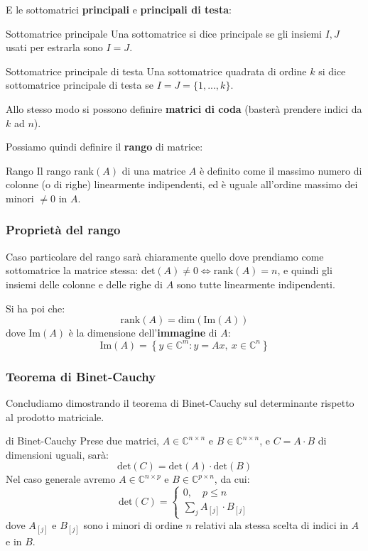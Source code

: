 \documentclass[a4paper,11pt]{article}
\begin{document}
E le sottomatrici \textbf{principali} e \textbf{principali di testa}:
\begin{definition}{Sottomatrice principale}
	Una sottomatrice si dice principale se gli insiemi $I, J$ usati per estrarla sono $I = J$.
\end{definition}
\begin{definition}{Sottomatrice principale di testa}
	Una sottomatrice quadrata di ordine $k$ si dice sottomatrice principale di testa se $I = J = \{ 1, ..., k \}$.
\end{definition}
Allo stesso modo si possono definire \textbf{matrici di coda} (basterà prendere indici da $k$ ad $n$).

Possiamo quindi definire il \textbf{rango} di matrice:
\begin{definition}{Rango}
	Il rango $\mathrm{rank}(A)$ di una matrice $A$ è definito come il massimo numero di colonne (o di righe) linearmente indipendenti, ed è uguale all'ordine massimo dei minori $\neq 0$ in $A$.
\end{definition}

\subsubsection{Proprietà del rango}
Caso particolare del rango sarà chiaramente quello dove prendiamo come sottomatrice la matrice stessa: $\mathrm{det}(A) \neq 0 \Leftrightarrow \mathrm{rank}(A) = n$, e quindi gli insiemi delle colonne e delle righe di $A$ sono tutte linearmente indipendenti.

Si ha poi che:
$$
\mathrm{rank}(A) = \mathrm{dim}(\mathrm{Im}(A))
$$
dove $\mathrm{Im}(A)$ è la dimensione dell'\textbf{immagine} di $A$:
$$
\mathrm{Im}(A) = \left\{ y \in \mathbb{C}^m : y = Ax, \ x \in \mathbb{C}^n \right\}
$$

\subsubsection{Teorema di Binet-Cauchy}
Concludiamo dimostrando il teorema di Binet-Cauchy sul determinante rispetto al prodotto matriciale.
\begin{theorem}{di Binet-Cauchy}
	Prese due matrici, $A \in \mathbb{C}^{n \times n}$ e $B \in \mathbb{C}^{n \times n}$, e $C = A \cdot B$ di dimensioni uguali, sarà:
	$$
	\mathrm{det}(C) = \mathrm{det}(A) \cdot \mathrm{det}(B)
	$$
Nel caso generale avremo $A \in \mathbb{C}^{n \times p}$ e $B \in \mathbb{C}^{p \times n}$, da cui:
$$
\mathrm{det}(C) =
	\begin{cases}
		0, \quad p \leq n \\
		\sum_j A_{[j]} \cdot B_{[j]}
	\end{cases}
$$
dove $A_{[j]}$ e $B_{[j]}$ sono i minori di ordine $n$ relativi ala stessa scelta di indici in $A$ e in $B$.
\end{theorem}
\end{document}
